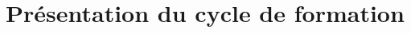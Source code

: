 \newpage \pagestyle{plain}


\chapter{Présentation du cycle de formation}









\chapter{\formationA}
%
% 
% 
%
%
%
%
%
% 
%
% 
% 
% 


\chapter{\formationB}


\chapter{\formationC}

\chapter{\formationD}

\chapter{\formationE}

\chapter{\formationFa}

